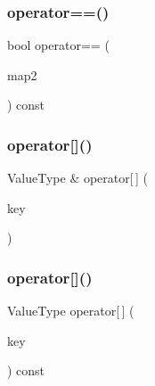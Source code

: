 \mbox{\label{classHashMap_a6d48826dae26d3467753daf4265ee951}} 
\subsubsection{\texorpdfstring{operator==()}{operator==()}}
{\footnotesize\ttfamily bool operator== (\begin{DoxyParamCaption}\item[{const \mbox{\hyperlink{classHashMap}{Hash\+Map}}$<$ Key\+Type, Value\+Type $>$ \&}]{map2 }\end{DoxyParamCaption}) const}

\mbox{\label{classHashMap_a5bd092d78b82b4818d17917816a59730}} 
\subsubsection{\texorpdfstring{operator[]()}{operator[]()}\hspace{0.1cm}{\footnotesize\ttfamily [1/2]}}
{\footnotesize\ttfamily Value\+Type \& operator\mbox{[}$\,$\mbox{]} (\begin{DoxyParamCaption}\item[{const Key\+Type \&}]{key }\end{DoxyParamCaption})}

\mbox{\label{classHashMap_a9f52896b148cfbbc16e12ad1008971b1}} 
\subsubsection{\texorpdfstring{operator[]()}{operator[]()}\hspace{0.1cm}{\footnotesize\ttfamily [2/2]}}
{\footnotesize\ttfamily Value\+Type operator\mbox{[}$\,$\mbox{]} (\begin{DoxyParamCaption}\item[{const Key\+Type \&}]{key }\end{DoxyParamCaption}) const}

\mbox{\label{classHashMap_af0d1d70a37332cb3054fe5b1b170927c}} 
